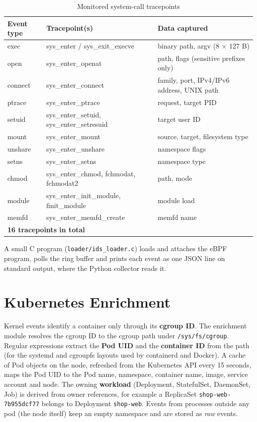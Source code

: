 \begin{table}[H]
\centering
\caption{Monitored system-call tracepoints}
\label{tab:tracepoints}
\footnotesize
\begin{tabularx}{\textwidth}{l >{\raggedright\arraybackslash}p{5.2cm} >{\raggedright\arraybackslash}X}
\toprule
\textbf{Event type} & \textbf{Tracepoint(s)} & \textbf{Data captured} \\
\midrule
exec    & sys\_enter / sys\_exit\_execve & binary path, argv (8 $\times$ 127 B) \\
open    & sys\_enter\_openat & path, flags (sensitive prefixes only) \\
connect & sys\_enter\_connect & family, port, IPv4/IPv6 address, UNIX path \\
ptrace  & sys\_enter\_ptrace & request, target PID \\
setuid  & sys\_enter\_setuid, sys\_enter\_setresuid & target user ID \\
mount   & sys\_enter\_mount & source, target, filesystem type \\
unshare & sys\_enter\_unshare & namespace flags \\
setns   & sys\_enter\_setns & namespace type \\
chmod   & sys\_enter\_chmod, fchmodat, fchmodat2 & path, mode \\
module  & sys\_enter\_init\_module, finit\_module & module load \\
memfd   & sys\_enter\_memfd\_create & memfd name \\
\midrule
\multicolumn{3}{l}{\textbf{16 tracepoints in total}} \\
\bottomrule
\end{tabularx}
\end{table}

A small C program (\texttt{loader/ids\_loader.c}) loads and attaches the eBPF program,
polls the ring buffer and prints each event as one JSON line on standard output, where
the Python collector reads it.

\section{Kubernetes Enrichment}

Kernel events identify a container only through its \textbf{cgroup ID}. The enrichment
module resolves the cgroup ID to the cgroup path under \texttt{/sys/fs/cgroup}. Regular
expressions extract the \textbf{Pod UID} and the \textbf{container ID} from the path
(for the systemd and cgroupfs layouts used by containerd and Docker). A cache of Pod
objects on the node, refreshed from the Kubernetes API every 15 seconds, maps the Pod
UID to the Pod name, namespace, container name, image, service account and node. The
owning \textbf{workload} (Deployment, StatefulSet, DaemonSet, Job) is derived from owner
references, for example a ReplicaSet \texttt{shop-web-7b955dcf77} belongs to
Deployment \texttt{shop-web}. Events from processes outside any pod (the node itself)
keep an empty namespace and are stored as \emph{raw} events.

